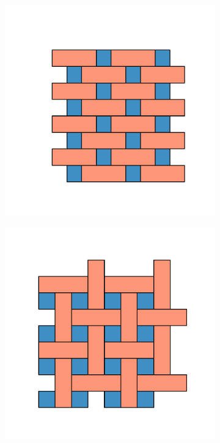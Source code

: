\begin{figure}[bt]
\begin{subfigure}[b]{0.16\textwidth}
         \caption{}
         \label{fig:pro3pksq2}
     \end{subfigure}
     \hfill
      \begin{subfigure}[b]{0.16\textwidth}
         \centering
         \includegraphics[width=\textwidth]{./figures/procrystals/t6.pdf}
         \caption{}
         \label{fig:pro3pksq3}
     \end{subfigure}
     \hfill
        \begin{subfigure}[b]{0.16\textwidth}
         \centering
         \includegraphics[width=\textwidth]{./figures/procrystals/t3.pdf}
         \caption{}
         \label{fig:pro3pksq4}
     \end{subfigure}
     \hfill
     

\end{figure}
